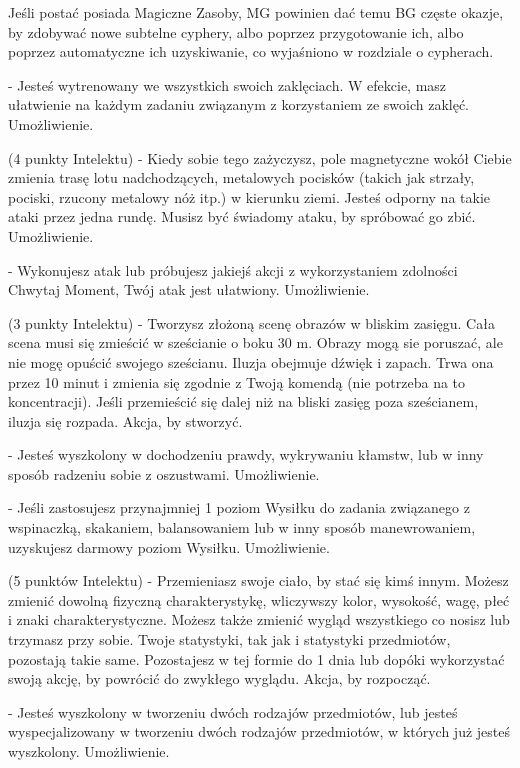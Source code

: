 {Jeśli postać posiada Magiczne Zasoby, MG powinien dać temu BG częste okazje, by zdobywać nowe subtelne cyphery, albo poprzez przygotowanie ich, albo poprzez automatyczne ich uzyskiwanie, co wyjaśniono w rozdziale o cypherach.

 - Jesteś wytrenowany we wszystkich swoich zaklęciach. W efekcie, masz ułatwienie na każdym zadaniu związanym z korzystaniem ze swoich zaklęć. Umożliwienie. 

 (4 punkty Intelektu) - Kiedy sobie tego zażyczysz, pole magnetyczne wokół Ciebie zmienia trasę lotu nadchodzących, metalowych pocisków (takich jak strzały, pociski, rzucony metalowy nóż itp.) w kierunku ziemi. Jesteś odporny na takie ataki przez jedna rundę. Musisz być świadomy ataku, by spróbować go zbić. Umożliwienie.

 - Wykonujesz atak lub próbujesz jakiejś akcji z wykorzystaniem zdolności Chwytaj Moment, Twój atak jest ułatwiony. Umożliwienie.

 (3 punkty Intelektu) - Tworzysz złożoną scenę obrazów w bliskim zasięgu. Cała scena musi się zmieścić w sześcianie o boku 30 m. Obrazy mogą sie poruszać, ale nie mogę opuścić swojego sześcianu. Iluzja obejmuje dźwięk i zapach. Trwa ona przez 10 minut i zmienia się zgodnie z Twoją komendą (nie potrzeba na to koncentracji). Jeśli przemieścić się dalej niż na bliski zasięg poza sześcianem, iluzja się rozpada. Akcja, by stworzyć. 

 - Jesteś wyszkolony w dochodzeniu prawdy, wykrywaniu kłamstw, lub w inny sposób radzeniu sobie z oszustwami. Umożliwienie. 

 - Jeśli zastosujesz przynajmniej 1 poziom Wysiłku do zadania związanego z wspinaczką, skakaniem, balansowaniem lub w inny sposób manewrowaniem, uzyskujesz darmowy poziom Wysiłku. Umożliwienie. 

 (5 punktów Intelektu) - Przemieniasz swoje ciało, by stać się kimś innym. Możesz zmienić dowolną fizyczną charakterystykę, wliczywszy kolor, wysokość, wagę, płeć i znaki charakterystyczne. Możesz także zmienić wygląd wszystkiego co nosisz lub trzymasz przy sobie. Twoje statystyki, tak jak i statystyki przedmiotów, pozostają takie same. Pozostajesz w tej formie do 1 dnia lub dopóki wykorzystać swoją akcję, by powrócić do zwykłego wyglądu. Akcja, by rozpocząć. 

 - Jesteś wyszkolony w tworzeniu dwóch rodzajów przedmiotów, lub jesteś wyspecjalizowany w tworzeniu dwóch rodzajów przedmiotów, w których już jesteś wyszkolony. Umożliwienie. 

}
